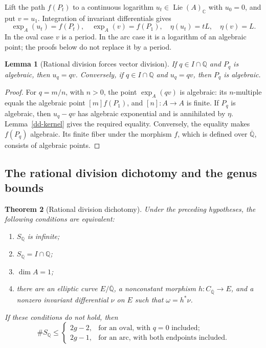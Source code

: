 \documentclass[11pt,a4paper]{article}
\newtheorem{theorem}{Theorem}[section]
\newtheorem{lemma}[theorem]{Lemma}
\theoremstyle{definition}
\theoremstyle{remark}
\numberwithin{equation}{section}
\newcommand{\Qbar}{\overline{\mathbb Q}}
\begin{document}
Lift the path $f(P_t)$ to a continuous logarithm
$u_t\in\operatorname{Lie}(A)_{\mathbb C}$ with $u_0=0$, and put $v=u_1$.
Integration of invariant differentials gives
\begin{equation}\label{dd-log-identities}
 \exp_A(u_t)=f(P_t),\quad \exp_A(v)=f(P_1),\quad
 \eta(u_t)=tL,\quad \eta(v)=L.
\end{equation}
In the oval case $v$ is a period.  In the arc case it is a logarithm of
an algebraic point; the proofs below do not replace it by a period.

\begin{lemma}[Rational division forces vector division]\label{dd-vector}
If $q\in I\cap\mathbb Q$ and $P_q$ is algebraic, then $u_q=qv$.
Conversely, if $q\in I\cap\mathbb Q$ and $u_q=qv$, then $P_q$ is
algebraic.
\end{lemma}
\begin{proof}
For $q=m/n$, with $n>0$, the point $\exp_A(qv)$ is algebraic: its
$n$-multiple equals the algebraic point $[m]f(P_1)$, and $[n]:A\to A$
is finite.  If $P_q$ is algebraic, then $u_q-qv$ has algebraic
exponential and is annihilated by $\eta$.  Lemma~\ref{dd-kernel} gives
the required equality.  Conversely, the equality makes $f(P_q)$
algebraic.  Its finite fiber under the morphism $f$, which is defined
over $\Qbar$, consists of algebraic points.
\end{proof}

\subsection{The rational division dichotomy and the genus bounds}

\begin{theorem}[Rational division dichotomy]\label{dd-rational}
Under the preceding hypotheses, the following conditions are equivalent:
\begin{enumerate}
\item $S_{\mathbb Q}$ is infinite;
\item $S_{\mathbb Q}=I\cap\mathbb Q$;
\item $\dim A=1$;
\item there are an elliptic curve $E/\Qbar$, a nonconstant morphism
$h:C_{\Qbar}\to E$, and a nonzero invariant differential $\nu$ on $E$
such that $\omega=h^*\nu$.
\end{enumerate}
If these conditions do not hold, then
\begin{equation}\label{dd-counts}
 \#S_{\mathbb Q}\le
 \begin{cases}
 2g-2,&\text{for an oval, with }q=0\text{ included};\\
 2g-1,&\text{for an arc, with both endpoints included}.
 \end{cases}
\end{equation}
\end{theorem}
\end{document}
